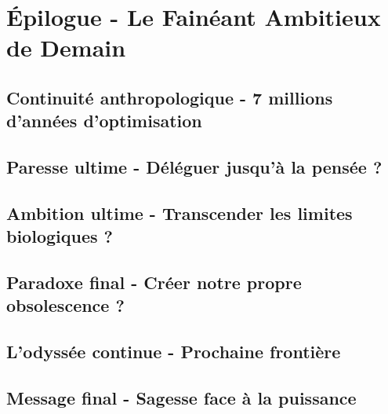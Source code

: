 \documentclass[12pt,a4paper]{book}
\begin{document}
\chapter{Épilogue - Le Fainéant Ambitieux de Demain}
\section{Continuité anthropologique - 7 millions d'années d'optimisation}
\section{Paresse ultime - Déléguer jusqu'à la pensée ?}
\section{Ambition ultime - Transcender les limites biologiques ?}
\section{Paradoxe final - Créer notre propre obsolescence ?}
\section{L'odyssée continue - Prochaine frontière}
\section{Message final - Sagesse face à la puissance}
\end{document}
